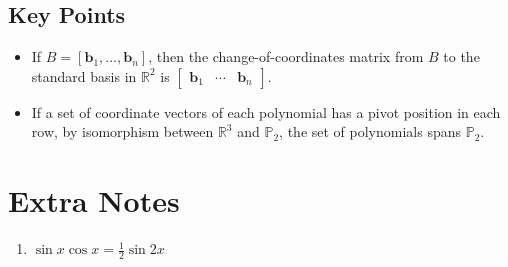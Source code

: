 \documentclass{article}
\begin{document}
\subsection*{Key Points}
\begin{itemize}
    \item If $B=\left[ \mathbf{b}_1, \ldots, \mathbf{b}_n\right]$, then the change-of-coordinates
    matrix from $B$ to the standard basis in $\mathbb{R}^2$ is
    $\begin{bmatrix} \mathbf{b}_1 & \cdots & \mathbf{b}_n\end{bmatrix}$.
    \item If a set of coordinate vectors of each polynomial has a pivot position in each row, by
    isomorphism between $\mathbb{R}^3$ and $\mathbb{P}_2$, the set of polynomials spans
    $\mathbb{P}_2$. 
\end{itemize}

\section*{Extra Notes}
\begin{enumerate}
    \item $\sin x \cos x = \frac{1}{2} \sin 2x$
\end{enumerate}
\end{document}
